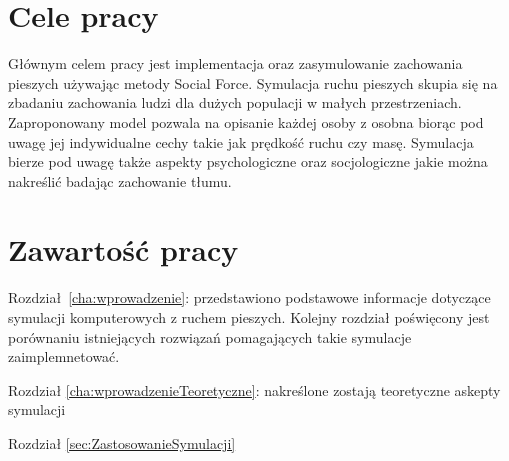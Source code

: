 
\section{Cele pracy}
\label{sec:celePracy}

Głównym celem pracy jest implementacja oraz zasymulowanie zachowania pieszych używając metody Social Force. Symulacja ruchu pieszych skupia się na zbadaniu zachowania ludzi dla dużych populacji w małych przestrzeniach. Zaproponowany model pozwala na opisanie każdej osoby z osobna biorąc pod uwagę jej indywidualne cechy takie jak prędkość ruchu czy masę. Symulacja bierze pod uwagę także aspekty psychologiczne oraz socjologiczne jakie można nakreślić badając zachowanie tłumu.


\section{Zawartość pracy}
\label{sec:zawartoscPracy}

Rozdział~\ref{cha:wprowadzenie}: przedstawiono podstawowe informacje dotyczące symulacji komputerowych z ruchem pieszych. Kolejny rozdział poświęcony jest porównaniu istniejących rozwiązań pomagających takie symulacje zaimplemnetować.

Rozdział \ref{cha:wprowadzenieTeoretyczne}: nakreślone zostają teoretyczne askepty symulacji

Rozdział \ref{sec:ZastosowanieSymulacji}

